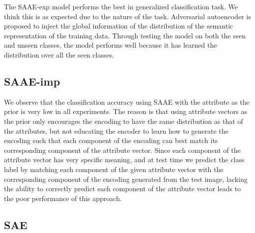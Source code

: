 \documentclass{article}
\begin{document}

The SAAE-exp model performs the best in generalized classification task. We think this is as expected due to the nature of the task. Adversarial autoencoder is proposed to inject the global information of the distribution of the semantic representation of the training data. Through testing the model on both the seen and unseen classes, the model performs well because it has learned the distribution over all the seen classes.

\subsection{SAAE-imp}

We observe that the classification accuracy using SAAE with the attribute as the prior is very low in all experiments. The reason is that using attribute vectors as the prior only encourages the encoding to have the same distribution as that of the attributes, but not educating the encoder to learn how to generate the encoding such that each component of the encoding can best match its corresponding component of the attribute vector. Since each component of the attribute vector has very specific meaning, and at test time we predict the class label by matching each component of the given attribute vector with the corresponding component of the encoding generated from the test image, lacking the ability to correctly predict each component of the attribute vector leads to the poor performance of this approach.


\subsection{SAE}
\label{subsec:SAE}
\end{document}
